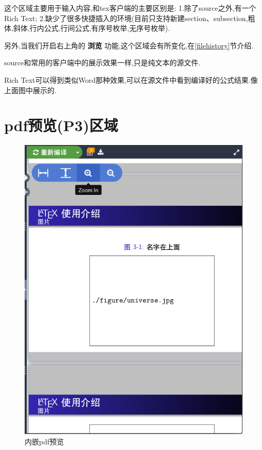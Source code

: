\documentclass[]{ctexbook}
\begin{document}
这个区域主要用于输入内容,和tex客户端的主要区别是:
1.除了source之外,有一个Rich Text;
2.缺少了很多快捷插入的环境(目前只支持新建section、subsection,粗体,斜体,行内公式,行间公式,有序号枚举,无序号枚举).

另外,当我们开启右上角的 \textbf{浏览} 功能,这个区域会有所变化,在\ref{filehistory}节介绍.

source和常用的客户端中的展示效果一样,只是纯文本的源文件.

Rich Text可以得到类似Word那种效果,可以在源文件中看到编译好的公式结果.像上面图中展示的.

\hypertarget{pdfp3}{%
\section{pdf预览(P3)区域}\label{pdfp3}}

\begin{figure}
\centering
\includegraphics{figure/P3.png}
\caption{内嵌pdf预览}
\end{figure}
\end{document}
